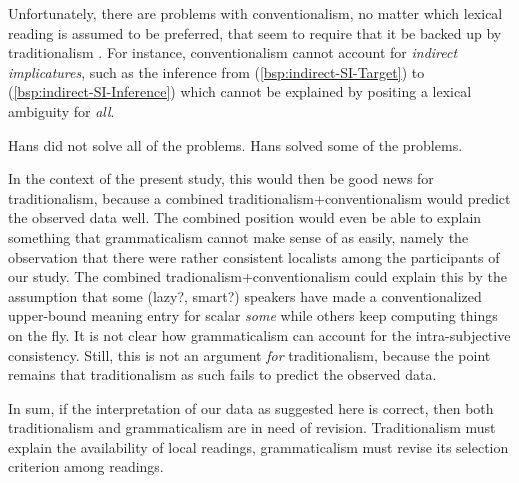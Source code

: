 \documentclass[fleqn,reqno,10pt,draft]{article}
\begin{document}
Unfortunately, there are problems with conventionalism, no matter
which lexical reading is assumed to be preferred, that seem to require
that it be backed up by traditionalism
\citep[e.g.][]{Sauerland2012:The-Computation}.
For instance, conventionalism cannot account for \emph{indirect
  implicatures}, such as the inference from
(\ref{bsp:indirect-SI-Target}) to (\ref{bsp:indirect-SI-Inference})
which cannot be explained by positing a lexical ambiguity for
\emph{all}.

\begin{exe}
  \ex \label{bsp:indirect-SI}
    \begin{xlist}
      \ex \label{bsp:indirect-SI-Target} Hans did not solve all of the problems.
      \ex \label{bsp:indirect-SI-Inference} Hans solved some of the problems.
    \end{xlist}
\end{exe}

\noindent In the context of the present study, this would then be good
news for traditionalism, because a combined
traditionalism+conventionalism would predict the observed data
well. The combined position would even be able to explain something
that grammaticalism cannot make sense of as easily, namely the
observation that there were rather consistent localists among the
participants of our study. The combined tradionalism+conventionalism
could explain this by the assumption that some (lazy?, smart?)
speakers have made a conventionalized upper-bound meaning entry for
scalar \emph{some} while others keep computing things on the fly. It
is not clear how grammaticalism can account for the intra-subjective
consistency. Still, this is not an argument \emph{for} traditionalism,
because the point remains that traditionalism as such fails to predict
the observed data.
  

In sum, if the interpretation of our data as suggested here is
correct, then both traditionalism and grammaticalism are in need of
revision. Traditionalism must explain the availability of local
readings, grammaticalism must revise its selection criterion among
readings.
\end{document}
